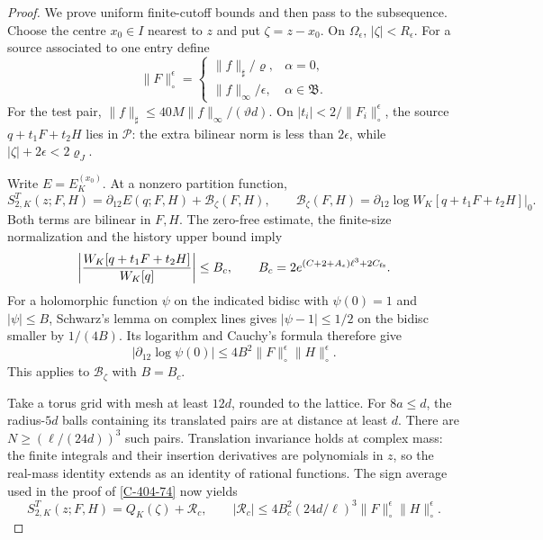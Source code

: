 \documentclass[11pt,letterpaper,reqno]{amsart}
\theoremstyle{definition}
\theoremstyle{remark}
\begin{document}
\begin{proof}
We prove uniform finite-cutoff bounds and then pass to the
subsequence. Choose the centre \(x_0\in I\) nearest to \(z\)
and put \(\zeta=z-x_0\). On \(\Omega_\epsilon\),
\(|\zeta|<R_\epsilon\).
For a source associated to one entry define
\[
 \|F\|_\circ^\epsilon=
 \begin{cases}
    \|f\|_\sharp/\varrho,&\alpha=0,\\
    \|f\|_\infty/\epsilon,&\alpha\in\mathfrak B.
 \end{cases}
\]
For the test pair,
\(\|f\|_\sharp\le40M\|f\|_\infty/(\vartheta d)\).
On \(|t_i|<2/\|F_i\|_\circ^\epsilon\), the source
\(q+t_1F+t_2H\) lies in \(\mathcal P\):
the extra bilinear norm is less than \(2\epsilon\), while
\(|\zeta|+2\epsilon<2\varrho_J\).

Write \(E=E_K^{(x_0)}\). At a nonzero partition function,
\[
 S^T_{2,K}(z;F,H)
   =\partial_{12}E(q;F,H)+\mathcal B_\zeta(F,H),\qquad
 \mathcal B_\zeta(F,H)
   =\partial_{12}\log W_K[q+t_1F+t_2H]\big|_0 .
\]
Both terms are bilinear in \(F,H\).
The zero-free estimate, the finite-size normalization and
the history upper bound imply
\[
 \left|\frac{W_K[q+t_1F+t_2H]}
                    {W_K[q]}\right|
       \le B_c,\qquad
 B_c=2e^{(C+2+A_\epsilon)\ell^3+2C_{\rm fs}}.
\]
For a holomorphic function \(\psi\) on the indicated bidisc
with \(\psi(0)=1\) and \(|\psi|\le B\), Schwarz's lemma
on complex lines gives \(|\psi-1|\le1/2\) on the bidisc
smaller by \(1/(4B)\). Its logarithm and Cauchy's formula
therefore give
\[
 |\partial_{12}\log\psi(0)|
        \le4B^2\|F\|_\circ^\epsilon\|H\|_\circ^\epsilon.
\]
This applies to \(\mathcal B_\zeta\) with \(B=B_c\).

Take a torus grid with mesh at least \(12d\), rounded to
the lattice. For \(8a\le d\), the radius-\(5d\) balls
containing its translated pairs are at distance at least
\(d\). There are \(N\ge(\ell/(24d))^3\) such pairs.
Translation invariance holds at complex mass: the finite
integrals and their insertion derivatives are polynomials
in \(z\), so the real-mass identity extends as an identity
of rational functions. The sign average used in the proof
of \cref{C-404-74} now yields
\begin{equation}\label{eq:qcdm2-mass-packing-complex}
 S^T_{2,K}(z;F,H)=Q_K(\zeta)+\mathcal R_c,\qquad
 |\mathcal R_c|\le4B_c^2(24d/\ell)^3
                   \|F\|_\circ^\epsilon\|H\|_\circ^\epsilon .
\end{equation}


\end{proof}
\end{document}
